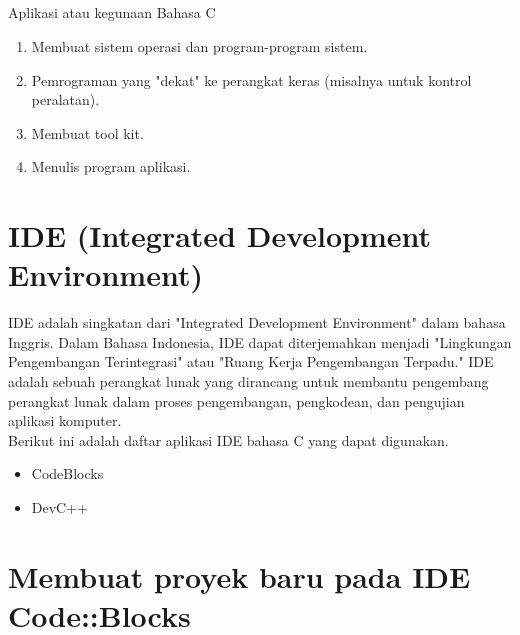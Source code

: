 \subsection*{}Aplikasi atau kegunaan Bahasa C
\begin{enumerate}
	\item     Membuat sistem operasi dan program-program sistem.
    \item Pemrograman yang "dekat" ke perangkat keras (misalnya untuk kontrol peralatan).
    \item Membuat tool kit.
    \item Menulis program aplikasi.
\end{enumerate}
\section{IDE (Integrated Development Environment)}
IDE adalah singkatan dari "Integrated Development Environment" dalam bahasa Inggris. 
Dalam Bahasa Indonesia, IDE dapat diterjemahkan menjadi "Lingkungan Pengembangan Terintegrasi" atau "Ruang Kerja Pengembangan Terpadu." 
IDE adalah sebuah perangkat lunak yang dirancang untuk membantu pengembang perangkat lunak dalam proses pengembangan, pengkodean, dan pengujian aplikasi komputer.
\\ 
Berikut ini adalah daftar aplikasi IDE bahasa C yang dapat digunakan.
\begin{itemize}
	\item CodeBlocks
	\item DevC++
\end{itemize}
\section{Membuat proyek baru pada IDE Code::Blocks} 
